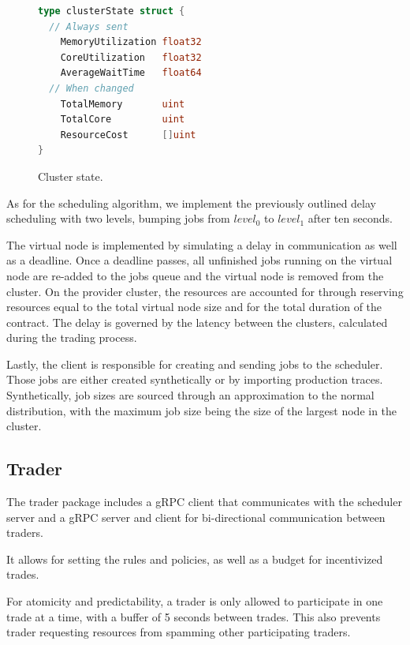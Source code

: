 \begin{figure}[H]
\begin{lstlisting}[language=go]
type clusterState struct {
  // Always sent
	MemoryUtilization float32
	CoreUtilization   float32
	AverageWaitTime   float64
  // When changed
    TotalMemory       uint
	TotalCore         uint
    ResourceCost      []uint
}
\end{lstlisting}
\caption{Cluster state.}
\label{clusterState}
\end{figure}

As for the scheduling algorithm, we implement the previously outlined delay
scheduling with two levels, bumping jobs from $level_0$ to $level_1$ after ten
seconds.

The virtual node is implemented by simulating a delay in communication as well
as a deadline. Once a deadline passes, all unfinished jobs running on the
virtual node are re-added to the jobs queue and the virtual node is removed
from the cluster. On the provider cluster, the resources are accounted for
through reserving resources equal to the total virtual node size and for the
total duration of the contract. The delay is governed by the latency between
the clusters, calculated during the trading process.

Lastly, the client is responsible for creating and sending jobs to the
scheduler. Those jobs are either created synthetically or by importing
production traces. Synthetically, job sizes are sourced through an
approximation to the normal distribution, with the maximum job size being the
size of the largest node in the cluster.

\subsection{Trader}

The trader package includes a gRPC client that communicates with the scheduler
server and a gRPC server and client for bi-directional communication between
traders.

It allows for setting the rules and policies, as well as a budget for
incentivized trades.

For atomicity and predictability, a trader is only allowed to participate in
one trade at a time, with a buffer of 5 seconds between trades. This also
prevents trader requesting resources from spamming other participating traders. 



